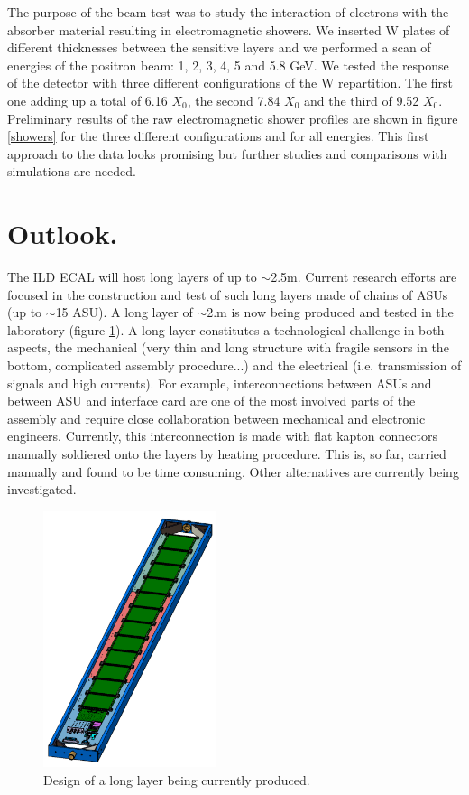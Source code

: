 \documentclass[journal]{IEEEtran}
\begin{document}
The purpose of the beam test was to study the interaction of electrons with the absorber material resulting in
electromagnetic showers.
We inserted W plates of different thicknesses between the sensitive layers and we performed
a scan of energies of the positron beam: 1, 2, 3, 4, 5 and 5.8 GeV.
We tested the response of the detector with three different configurations of the W repartition.
The first one adding up a total of 6.16 $X_{0}$, the second 7.84 $X_{0}$ and the third of 9.52 $X_{0}$.
Preliminary results of the raw electromagnetic shower profiles are shown in figure \ref{showers}
for the three different configurations and for all energies. This first approach to the data looks promising but further studies and comparisons with simulations are needed.



\section{Outlook.}

The ILD ECAL will host long layers of up to $\sim$2.5m.
Current research efforts are focused in the construction and test of such long layers made of chains of ASUs (up to $\sim$15 ASU).
A long layer of $\sim$2.m  is now being produced and tested in the laboratory (figure \ref{longslab}).
A long layer constitutes a technological challenge in both aspects, the mechanical
(very thin and long structure with fragile sensors in the bottom, complicated assembly procedure...)
and the electrical (i.e. transmission of signals and high currents).
For example, interconnections between ASUs and between ASU and interface card are one of the most involved parts of the assembly
and require close collaboration between mechanical and electronic engineers.
Currently, this interconnection is made with flat kapton connectors manually soldiered onto the layers by heating procedure.
This is, so far, carried manually and found to be time consuming. Other alternatives are currently being  investigated.


\begin{figure}[!t]
\centering
\includegraphics[width=2.0in]{longslab-eps-converted-to.pdf}
\caption{Design of a long layer being currently produced.}
\label{longslab}
\end{figure}
\end{document}
